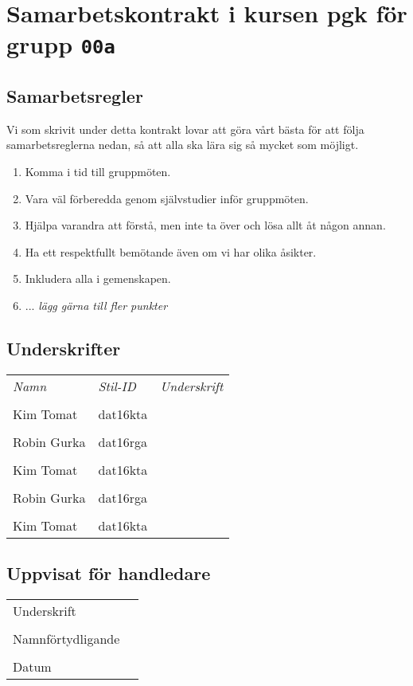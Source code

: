 \documentclass[12pt]{article}
\begin{document}
\clearpage\thispagestyle{empty}

\section*{Samarbetskontrakt i kursen pgk för grupp \texttt{00a}}
\subsection*{Samarbetsregler}
Vi som skrivit under detta kontrakt lovar att göra vårt bästa för att följa samarbetsreglerna nedan, så att alla ska lära sig så mycket som möjligt. 
\begin{enumerate}
\item Komma i tid till gruppmöten.
\item Vara väl förberedda genom självstudier inför gruppmöten.
\item Hjälpa varandra att förstå, men inte ta över och lösa allt åt någon annan.
\item Ha ett respektfullt bemötande även om vi har olika åsikter.
\item Inkludera alla i gemenskapen.
\item ... \emph{lägg gärna till fler punkter}
\end{enumerate}

\subsection*{Underskrifter}
\vspace{1em}

\begin{tabular}{l l p{7cm}}
\emph{Namn} & \emph{Stil-ID} & \emph{Underskrift} \\
\\ Kim Tomat & dat16kta & \dotfill \\
\\ Robin Gurka & dat16rga & \dotfill \\
\\ Kim Tomat & dat16kta & \dotfill \\
\\ Robin Gurka & dat16rga & \dotfill \\
\\ Kim Tomat & dat16kta & \dotfill \\
\end{tabular}

\vspace{1em }
\subsection*{Uppvisat för handledare}

\begin{tabular}{l p{8cm}}
\\ Underskrift &  \dotfill \\
\\ Namnförtydligande &  \dotfill \\
\\ Datum & \dotfill \\
\end{tabular}
\end{document}
